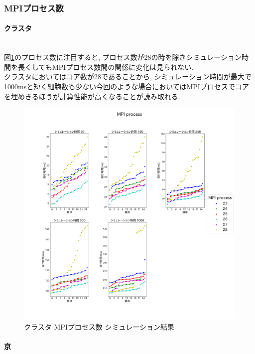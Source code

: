 \subsubsection{MPIプロセス数}
\paragraph{クラスタ}~\\
図\ref{fig:cluster-mpi-process}のプロセス数に注目すると, プロセス数が28の時を除きシミュレーション時間を長くしてもMPIプロセス数間の関係に変化は見られない.\\
クラスタにおいてはコア数が28であることから,
シミュレーション時間が最大で1000msと短く細胞数も少ない今回のような場合においてはMPIプロセスでコアを埋めきるほうが計算性能が高くなることが読み取れる.\\
\begin{figure}[htb]
\begin{center}
    \includegraphics[width=12cm]{./images/cluster-MPI-process.pdf}
    \caption{クラスタ MPIプロセス数 シミュレーション結果}
    \label{fig:cluster-mpi-process}
\end{center}
\end{figure}
\clearpage

\paragraph{京}~\\

